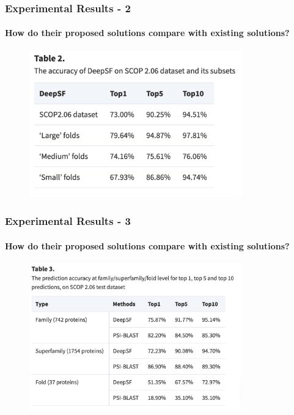 \documentclass[xcolor={usenames,dvipsnames},hyperref={hyperindex,bookmarks}]{beamer}
\begin{document}
\frame
{
	\frametitle{Experimental Results - 2}
	\framesubtitle{How do their proposed solutions compare with existing solutions?}


	\begin{figure}[h]
	\centering 
	\includegraphics[height=2.5in]{./pics/table-2}
	\label{fig:Table2}
	\end{figure}
}





\frame
{
	\frametitle{Experimental Results - 3}
	\framesubtitle{How do their proposed solutions compare with existing solutions?}


	\begin{figure}[h]
	\centering 
	\includegraphics[height=2.5in]{./pics/table-3}
	\label{fig:Table3}
	\end{figure}
}
\end{document}
